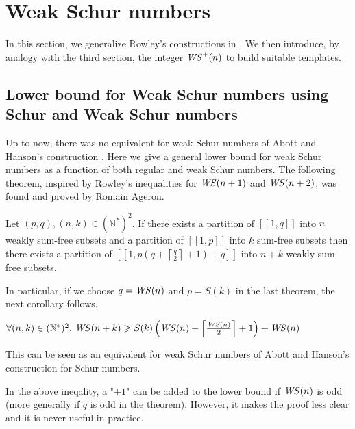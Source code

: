 \section{Weak Schur numbers}

In this section, we generalize Rowley's constructions in \cite{RowleyWS}. We then introduce, by analogy with the third
section, the
integer \(\mathit{WS}^+(n)\)
to build suitable templates.

\subsection{Lower bound for Weak Schur numbers using Schur and Weak Schur numbers}

Up to now, there was no equivalent for weak Schur numbers of Abott and Hanson's construction \cite{AbbottHanson}. Here
we
give a general lower bound for weak Schur numbers as a function of both regular and weak Schur numbers.
The following theorem, inspired by Rowley's inequalities for \(\mathit{WS} (n+1)\) and \(\mathit{WS} (n+2)\), was found and proved
by Romain Ageron.

\begin{theorem}
Let \((p,q), (n,k) \in (\mathbb{N}^*)^2\). If there exists a partition of \([\![1,q]\!]\) into \(n\) weakly sum-free
subsets and a partition of \([\![1,p]\!]\) into \(k\) sum-free
subsets then there exists a partition of \([\![1,p(q+\left \lceil \frac{q}{2} \right \rceil + 1)+q]\!]\) into \(n+k\)
weakly sum-free subsets.
\end{theorem}

In particular, if we choose \(q = \mathit{WS} (n)\) and \(p = S(k)\) in the last theorem, the next corollary follows.

\begin{corollary}
\( \forall (n,k) \in (\mathbb{N}^*)^2 \text{, } \mathit{WS} (n+k) \geqslant S(k) \left (\mathit{WS} (n) + \left \lceil \frac{\mathit{WS} (n)}{2}
\right \rceil +1 \right) + \mathit{WS} (n)\)
\end{corollary}

\begin{remark}
This can be seen as an equivalent for weak Schur numbers of Abott and Hanson's construction for Schur numbers.
\end{remark}

\begin{remark}
In the above ineqality, a "\(+1\)" can be added to the lower bound if \(\mathit{WS} (n)\) is odd (more generally if \(q\) is odd in the theorem). However, it makes the proof less
clear and it is never useful in practice.
\end{remark}


